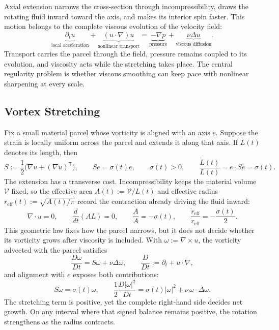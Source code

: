 
Axial extension narrows the cross-section through incompressibility, draws the rotating fluid inward toward the axis, and makes its interior spin faster. This motion belongs to the complete viscous evolution of the velocity field:
\[
  \underbrace{\partial_t u}_{\text{local acceleration}}
  +
  \underbrace{(u\cdot\nabla)u}_{\text{nonlinear transport}}
  =
  \underbrace{-\nabla p}_{\text{pressure}}
  +
  \underbrace{\nu\Delta u}_{\text{viscous diffusion}}.
\]
Transport carries the parcel through the field, pressure remains coupled to its evolution, and viscosity acts while the stretching takes place. The central regularity problem is whether viscous smoothing can keep pace with nonlinear sharpening at every scale.

\subsection{Vortex Stretching}\label{sub:ThePerfectlyStretchingVortex}

Fix a small material parcel whose vorticity is aligned with an axis \(e\). Suppose the strain is locally uniform across the parcel and extends it along that axis. If \(L(t)\) denotes its length, then
\[
  S:=\frac12\bigl(\nabla u+(\nabla u)^{\mathsf T}\bigr),
  \qquad
  Se=\sigma(t)e,
  \qquad
  \sigma(t)>0,
  \qquad
  \frac{\dot L(t)}{L(t)}
  =
  e\cdot Se
  =
  \sigma(t).
\]
The extension has a transverse cost. Incompressibility keeps the material volume \(\mathcal V\) fixed, so the effective area \(A(t):=\mathcal V/L(t)\) and effective radius \(r_{\mathrm{eff}}(t):=\sqrt{A(t)/\pi}\) record the contraction already driving the fluid inward:
\[
  \nabla\cdot u=0,
  \qquad
  \frac{d}{dt}(A L)=0,
  \qquad
  \frac{\dot A}{A}=-\sigma(t),
  \qquad
  \frac{\dot r_{\mathrm{eff}}}{r_{\mathrm{eff}}}
  =
  -\frac{\sigma(t)}{2}.
\]
This geometric law fixes how the parcel narrows, but it does not decide whether its vorticity grows after viscosity is included. With \(\omega:=\nabla\times u\), the vorticity advected with the parcel satisfies
\[
  \frac{D\omega}{Dt}
  =
  S\omega+\nu\Delta\omega,
  \qquad
  \frac{D}{Dt}
  :=
  \partial_t+u\cdot\nabla,
\]
and alignment with \(e\) exposes both contributions:
\[
  S\omega
  =
  \sigma(t)\omega,
  \qquad
  \frac12\frac{D|\omega|^2}{Dt}
  =
  \sigma(t)|\omega|^2
  +
  \nu\,\omega\cdot\Delta\omega.
\]
The stretching term is positive, yet the complete right-hand side decides net growth. On any interval where that signed balance remains positive, the rotation strengthens as the radius contracts.


